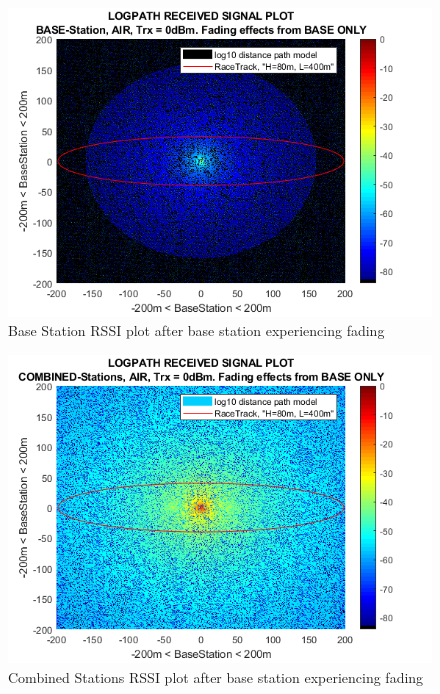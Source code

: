 \begin{figure}[H]
	\centering
	\includegraphics[width=\linewidth]{theory/fading/fig/logpathReceivedSignal_baseStation_baseOnly.png}
	\caption{Base Station RSSI plot after base station experiencing fading}
	\label{fig:logpathReceivedSignal_baseStation_baseOnly}
\end{figure}

\begin{figure}[H]
	\centering
	\includegraphics[width=\linewidth]{theory/fading/fig/logpathReceivedSignal_combinedStations_baseOnly.png}
	\caption{Combined Stations RSSI plot after base station experiencing fading}
	\label{fig:logpathReceivedSignal_combinedStations_baseOnly}
\end{figure}

